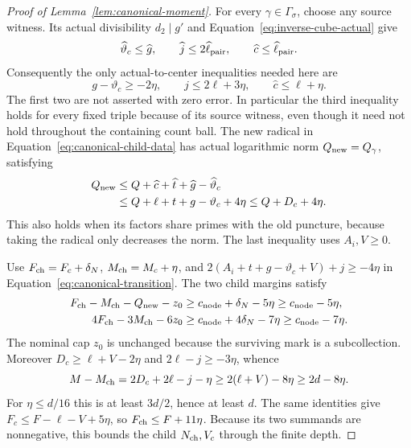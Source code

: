 \documentclass[12pt]{article}
\begin{document}
\begin{proof}[Proof of Lemma~\ref{lem:canonical-moment}]
For every \(\gamma\in\Gamma_\sigma\), choose any source witness.
Its actual divisibility \(d_2\mid g'\) and
Equation~\eqref{eq:inverse-cube-actual} give
\[
 \widehat\vartheta_c\le\widehat g,\qquad
 \widehat j\le2\widehat\ell_{\rm pair},\qquad
 \widehat c\le\widehat\ell_{\rm pair}.
\]
Consequently the only actual-to-center inequalities needed here are
\begin{equation}\label{eq:inverse-center-inequalities}
 g-\vartheta_c\ge-2\eta,\qquad j\le2\ell+3\eta,\qquad
 \widehat c\le\ell+\eta.
\end{equation}
The first two are not asserted with zero error.  In particular the
third inequality holds for every fixed triple because of its source
witness, even though it need not hold throughout the containing count
ball.  The new radical in Equation~\eqref{eq:canonical-child-data}
has actual logarithmic norm \(Q_{\rm new}=Q_\gamma\), satisfying
\begin{equation}\label{eq:inverse-new-puncture}
 \begin{split}
 Q_{\rm new}&\le Q+\widehat c+\widehat t+\widehat g-\widehat\vartheta_c\\
 &\le Q+\ell+t+g-\vartheta_c+4\eta\le Q+D_c+4\eta.
 \end{split}
\end{equation}
This also holds when its factors share primes with the old puncture,
because taking the radical only decreases the norm.  The last inequality
uses \(A_i,V\ge0\).

Use \(F_{\rm ch}=F_c+\delta_N\), \(M_{\rm ch}=M_c+\eta\), and
\(2(A_i+t+g-\vartheta_c+V)+j\ge-4\eta\) in
Equation~\eqref{eq:canonical-transition}.  The two child margins satisfy
\begin{equation}\label{eq:inverse-child-margins}
 \begin{aligned}
 F_{\rm ch}-M_{\rm ch}-Q_{\rm new}-z_0
   &\ge c_{\rm node}+\delta_N-5\eta\ge c_{\rm node}-5\eta,\\
 4F_{\rm ch}-3M_{\rm ch}-6z_0
   &\ge c_{\rm node}+4\delta_N-7\eta\ge c_{\rm node}-7\eta.
 \end{aligned}
\end{equation}
The nominal cap \(z_0\) is unchanged because the surviving mark is a
subcollection.  Moreover \(D_c\ge\ell+V-2\eta\) and
\(2\ell-j\ge-3\eta\), whence
\begin{equation}\label{eq:inverse-row-decrease}
 M-M_{\rm ch}=2D_c+2\ell-j-\eta
       \ge2(\ell+V)-8\eta\ge2d-8\eta.
\end{equation}
For \(\eta\le d/16\) this is at least \(3d/2\), hence at least \(d\).
The same identities give \(F_c\le F-\ell-V+5\eta\), so
\(F_{\rm ch}\le F+11\eta\).  Because its two summands are nonnegative,
this bounds the child \(N_{\rm ch},V_c\) through the finite depth.


\end{proof}
\end{document}

